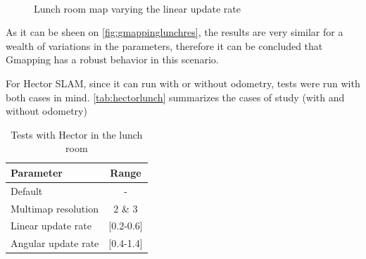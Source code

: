 \begin{figure}[t!]
   \\
   \quad
  \caption{Lunch room map varying the linear update rate}
  \label{fig:gmappinglunchres}
\end{figure}  

As it can be sheen on \autoref{fig:gmappinglunchres}, the results are very similar for a wealth of variations in the parameters, therefore it can be concluded that Gmapping has a robust behavior in this scenario. 

\clearpage
{} For Hector SLAM, since it can run with or without odometry, tests were run with both cases in mind. \autoref{tab:hectorlunch} summarizes the cases of study (with and without odometry)
\begin{table}[h]
  \centering
  \begin{tabular}{lc}
    \hline
    \textbf{Parameter} & \textbf{Range} \\ \hline
    Default & - \\ \hline
    Multimap resolution & 2 \& 3 \\ \hline
    Linear update rate & {[}0.2-0.6{]} \\ \hline
    Angular update rate & {[}0.4-1.4{]} \\ \hline
  \end{tabular}
  \caption{Tests with Hector in the lunch room}
  \label{tab:hectorlunch}
\end{table}

